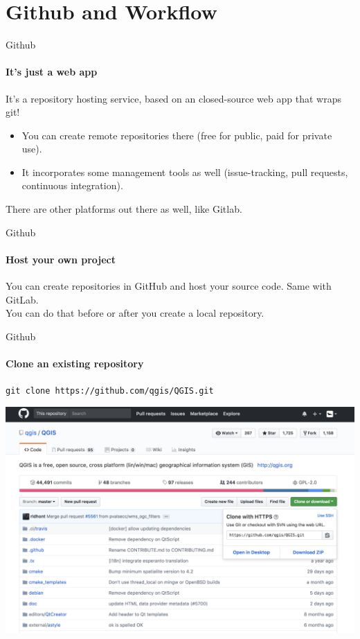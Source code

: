 \documentclass{beamer}
\begin{document}
\section{Github and Workflow}

\begin{frame}{Github}
\framesubtitle{It's just a web app}
It's a repository hosting service, based on an closed-source web app that wraps git!

\begin{itemize}
	\item You can create remote repositories there (free for public, paid for private use).
	\item It incorporates some management tools as well (issue-tracking, pull requests, continuous integration).
\end{itemize}

There are other platforms out there as well, like Gitlab.
\end{frame}

\begin{frame}{Github}
\framesubtitle{Host your own project}
You can create repositories in GitHub and host your source code. Same with GitLab.
\\
You can do that before or after you create a local repository.
\end{frame}

\begin{frame}{Github}
\framesubtitle{Clone an existing repository}
\alert{\texttt{git clone https://github.com/qgis/QGIS.git}}

\includegraphics[width=\textwidth]{resources/github.png}
\end{frame}
    
\end{document}
